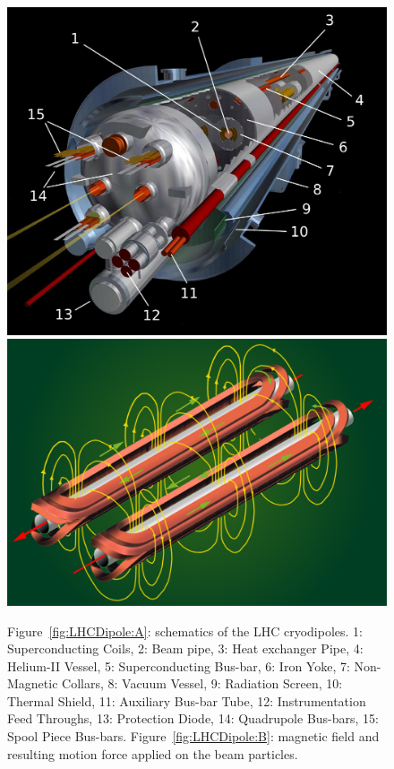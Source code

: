 \endgroup
\begingroup\setlength{\intextsep}{5pt}\setlength{\columnsep}{15pt}
	
	\begin{figure}
		\begin{minipage}{\linewidth}
			\centering\captionsetup[subfigure]{justification=centering}
			\includegraphics[width = \linewidth]{fig/chapt2/LHC-dipole.png}
			\subcaption{\label{fig:LHCDipole:A}}
			\includegraphics[width = \linewidth]{fig/chapt2/LHC-dipole-field.jpg}
			\subcaption{\label{fig:LHCDipole:B}}
		\end{minipage}
		\caption{\label{fig:LHCDipole} Figure~\ref{fig:LHCDipole:A}: schematics of the LHC cryodipoles. 1: Superconducting Coils, 2: Beam pipe, 3: Heat exchanger Pipe, 4: Helium-II Vessel, 5: Superconducting Bus-bar, 6: Iron Yoke, 7: Non-Magnetic Collars, 8: Vacuum Vessel, 9: Radiation Screen, 10: Thermal Shield, 11: Auxiliary Bus-bar Tube, 12: Instrumentation Feed Throughs, 13: Protection Diode, 14: Quadrupole Bus-bars, 15: Spool Piece Bus-bars. Figure~\ref{fig:LHCDipole:B}: magnetic field and resulting motion force applied on the beam particles.}
	\end{figure}
	
